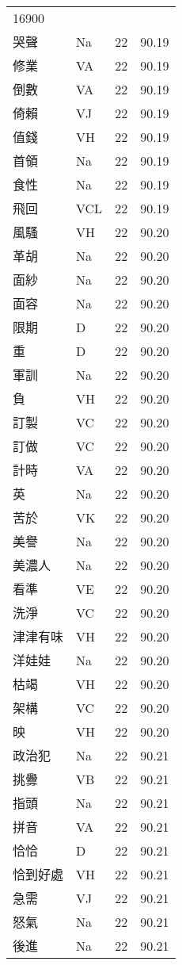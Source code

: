 \documentclass[twocolumn]{book}
\begin{document}
\begin{supertabular}{llrr}
16900\\
哭聲 & Na & 22 &  90.19\\
修業 & VA & 22 &  90.19\\
倒數 & VA & 22 &  90.19\\
倚賴 & VJ & 22 &  90.19\\
值錢 & VH & 22 &  90.19\\
首領 & Na & 22 &  90.19\\
食性 & Na & 22 &  90.19\\
飛回 & VCL & 22 &  90.19\\
風騷 & VH & 22 &  90.20\\
革胡 & Na & 22 &  90.20\\
面紗 & Na & 22 &  90.20\\
面容 & Na & 22 &  90.20\\
限期 & D & 22 &  90.20\\
重 & D & 22 &  90.20\\
軍訓 & Na & 22 &  90.20\\
負 & VH & 22 &  90.20\\
訂製 & VC & 22 &  90.20\\
訂做 & VC & 22 &  90.20\\
計時 & VA & 22 &  90.20\\
英 & Na & 22 &  90.20\\
苦於 & VK & 22 &  90.20\\
美譽 & Na & 22 &  90.20\\
美濃人 & Na & 22 &  90.20\\
看準 & VE & 22 &  90.20\\
洗淨 & VC & 22 &  90.20\\
津津有味 & VH & 22 &  90.20\\
洋娃娃 & Na & 22 &  90.20\\
枯竭 & VH & 22 &  90.20\\
架構 & VC & 22 &  90.20\\
映 & VH & 22 &  90.20\\
政治犯 & Na & 22 &  90.21\\
挑釁 & VB & 22 &  90.21\\
指頭 & Na & 22 &  90.21\\
拼音 & VA & 22 &  90.21\\
恰恰 & D & 22 &  90.21\\
恰到好處 & VH & 22 &  90.21\\
急需 & VJ & 22 &  90.21\\
怒氣 & Na & 22 &  90.21\\
後進 & Na & 22 &  90.21\\

\end{supertabular}
\end{document}
